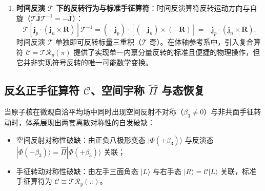 \begin{enumerate}
\begin{equation}
\end{equation}
矩阵 $M_{\text{axial}}$ 的行列式为 $\det(M_{\text{axial}}) = (-1) \times (-1) \times (+1) = +1$。因此三个轴矢量的标量三重积在普通空间平面的镜像反射下严格保持不变：
\begin{equation}\label{eq:3-7-reflection-preserve}
\det[M_{\text{axial}}\mathbf{j}_p, M_{\text{axial}}\mathbf{j}_n, M_{\text{axial}}\mathbf{R}] = \det(M_{\text{axial}}) \det[\mathbf{j}_p, \mathbf{j}_n, \mathbf{R}] = +\mathbf{j}_p \cdot (\mathbf{j}_n \times \mathbf{R}).
\end{equation}
式~\eqref{eq:3-7-reflection-preserve} 证明：普通空间平面正交反射并不反转标量三重积 $\chi_{\text{geom}}$，因而该手征旋向性并非空间宇称奇（$\mathcal{P}$ 奇）的序参量。必须明确指出，标量积本身在反射下的不变性并不等同于整个取向核态或三矢量空间构型在普通空间反射下完全不变；
\item \textbf{时间反演 $\mathcal{T}$ 下的反转行为与标准手征算符}：时间反演算符反转运动方向与自旋（$\mathcal{T} \hat{\mathbf{J}} \mathcal{T}^{-1} = -\hat{\mathbf{J}}$）：
\begin{equation}\label{eq:3-7-triple-time-reversal}
\mathcal{T} \left[ \mathbf{j}_p \cdot (\mathbf{j}_n \times \mathbf{R}) \right] \mathcal{T}^{-1} = (-\mathbf{j}_p) \cdot \left[ (-\mathbf{j}_n) \times (-\mathbf{R}) \right] = - \mathbf{j}_p \cdot (\mathbf{j}_n \times \mathbf{R}).
\end{equation}
时间反演 $\mathcal{T}$ 单独即可反转标量三重积（$\mathcal{T}$ 奇）。在体轴参考系中，引入复合算符 $\mathcal{C} = \mathcal{T} \mathcal{R}_y(\pi)$ 提供了实现单一内禀分量反转的标准且便捷的物理操作，但它并非实现符号反转的唯一可能数学变换。
\end{enumerate}

\subsection{反幺正手征算符 $\mathcal{C}$、空间宇称 $\hat{\Pi}$ 与态恢复}\label{sec:3-7-3}

当原子核在微观自洽平均场中同时出现空间反射不对称（$\beta_3 \ne 0$）与非共面手征转动时，体系展现出两套离散对称性的自发破缺：
\begin{itemize}
\item 空间反射对称性破缺：由正负八极形变态 $|\Phi(+\beta_3)\rangle$ 与反演态 $|\Phi(-\beta_3)\rangle = \hat{\Pi} |\Phi(+\beta_3)\rangle$ 关联；
\item 手征转动对称性破缺：由左手三面角态 $|L\rangle$ 与右手态 $|R\rangle = \mathcal{C} |L\rangle$ 关联，标准手征算符为 $\mathcal{C} \equiv \mathcal{T} \mathcal{R}_y(\pi)$。
\end{itemize}

